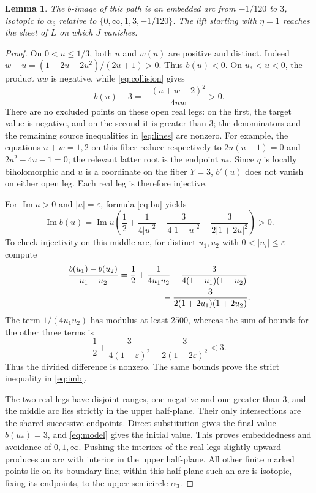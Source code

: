 \documentclass[11pt]{article}
\newtheorem{lemma}[theorem]{Lemma}
\theoremstyle{remark}
\begin{document}
\begin{lemma}\label{lem:arc}
The $b$-image of this path is an embedded arc from $-1/120$ to $3$, isotopic to $\alpha_3$ relative to $\{0,\infty,1,3,-1/120\}$. The lift starting with $\eta=1$ reaches the sheet of $L$ on which $J$ vanishes.
\end{lemma}
\begin{proof}
On $0<u\leq1/3$, both $u$ and $w(u)$ are positive and distinct. Indeed $w-u=(1-2u-2u^2)/(2u+1)>0$. Thus $b(u)<0$. On $u_*<u<0$, the product $uw$ is negative, while \eqref{eq:collision} gives
\[
 b(u)-3=-\frac{(u+w-2)^2}{4uw}>0.
\]
There are no excluded points on these open real legs: on the first, the target value is negative, and on the second it is greater than $3$; the denominators and the remaining source inequalities in \eqref{eq:lines} are nonzero. For example, the equations $u+w=1,2$ on this fiber reduce respectively to $2u(u-1)=0$ and $2u^2-4u-1=0$; the relevant latter root is the endpoint $u_*$. Since $q$ is locally biholomorphic and $u$ is a coordinate on the fiber $Y=3$, $b'(u)$ does not vanish on either open leg. Each real leg is therefore injective.

For $\operatorname{Im}u>0$ and $|u|=\varepsilon$, formula \eqref{eq:bu} yields
\begin{equation}\label{eq:imb}
 \operatorname{Im}b(u)=\operatorname{Im}u\left(
 \frac12+\frac1{4|u|^2}-\frac3{4|1-u|^2}
                  -\frac3{2|1+2u|^2}\right)>0.
\end{equation}
To check injectivity on this middle arc, for distinct $u_1,u_2$ with $0<|u_i|\leq\varepsilon$ compute
\begin{align}\label{eq:divdiff}
 \frac{b(u_1)-b(u_2)}{u_1-u_2}
 &=\frac12+\frac1{4u_1u_2}
   -\frac3{4(1-u_1)(1-u_2)}\nonumber\\
 &\hspace{18mm}-\frac3{2(1+2u_1)(1+2u_2)}.
\end{align}
The term $1/(4u_1u_2)$ has modulus at least $2500$, whereas the sum of bounds for the other three terms is
\[
 \frac12+\frac3{4(1-\varepsilon)^2}
          +\frac3{2(1-2\varepsilon)^2}<3.
\]
Thus the divided difference is nonzero. The same bounds prove the strict inequality in \eqref{eq:imb}.

The two real legs have disjoint ranges, one negative and one greater than $3$, and the middle arc lies strictly in the upper half-plane. Their only intersections are the shared successive endpoints. Direct substitution gives the final value $b(u_*)=3$, and \eqref{eq:model} gives the initial value. This proves embeddedness and avoidance of $0,1,\infty$. Pushing the interiors of the real legs slightly upward produces an arc with interior in the upper half-plane. All other finite marked points lie on its boundary line; within this half-plane such an arc is isotopic, fixing its endpoints, to the upper semicircle $\alpha_3$.


\end{proof}
\end{document}
